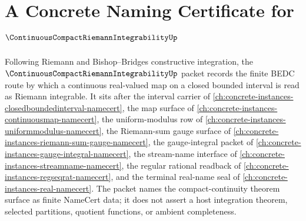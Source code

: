 \chapter{A Concrete Naming Certificate for $\ContinuousCompactRiemannIntegrabilityUp$}
\label{ch:concrete-instances-continuous-compact-riemann-integrability-namecert}

Following Riemann and Bishop--Bridges constructive integration, the $\ContinuousCompactRiemannIntegrabilityUp$ packet records the finite BEDC route by which a continuous real-valued map on a closed bounded interval is read as Riemann integrable. It sits after the interval carrier of \autoref{ch:concrete-instances-closedboundedinterval-namecert}, the map surface of \autoref{ch:concrete-instances-continuousmap-namecert}, the uniform-modulus row of \autoref{ch:concrete-instances-uniformmodulus-namecert}, the Riemann-sum gauge surface of \autoref{ch:concrete-instances-riemann-sum-gauge-namecert}, the gauge-integral packet of \autoref{ch:concrete-instances-gauge-integral-namecert}, the stream-name interface of \autoref{ch:concrete-instances-streamname-namecert}, the regular rational readback of \autoref{ch:concrete-instances-regseqrat-namecert}, and the terminal real-name seal of \autoref{ch:concrete-instances-real-namecert}. The packet names the compact-continuity theorem surface as finite NameCert data; it does not assert a host integration theorem, selected partitions, quotient functions, or ambient completeness.

